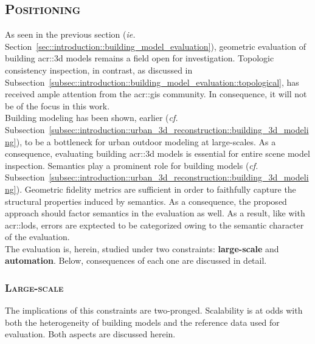    \subsection{\textsc{Positioning}}
        \label{subsec::introduction::contributions::positioning}
        As seen in the previous section (\textit{ie.} Section~\ref{sec::introduction::building_model_evaluation}), geometric evaluation of building \gls{acr::3d} models remains a field open for investigation.
        Topologic consistency inspection, in contrast, as discussed in Subsection~\ref{subsec::introduction::building_model_evaluation::topological}, has received ample attention from the \gls{acr::gis} community.
        In consequence, it will not be of the focus in this work.\\

        Building modeling has been shown, earlier (\textit{cf.} Subsection~\ref{subsec::introduction::urban_3d_reconstruction::building_3d_modeling}), to be a bottleneck for urban outdoor modeling at large-scales.
        As a consequence, evaluating building \gls{acr::3d} models is essential for entire scene model inspection.
        Semantics play a prominent role for building models (\textit{cf.} Subsection~\ref{subsec::introduction::urban_3d_reconstruction::building_3d_modeling}).
        Geometric fidelity metrics are sufficient in order to faithfully capture the structural properties induced by semantics.
        As a consequence, the proposed approach should factor semantics in the evaluation as well.
        As a result, like with \glspl{acr::lod}, errors are exptected to be categorized owing to the semantic character of the evaluation.\\

        The evaluation is, herein, studied under two constraints: \textbf{large-scale} and \textbf{automation}.
        Below, consequences of each one are discussed in detail.
        \subsubsection{\textsc{Large-scale}}
            The implications of this constraints are two-pronged.
            Scalability is at odds with both the heterogeneity of building models and the reference data used for evaluation.
            Both aspects are discussed herein.\\

